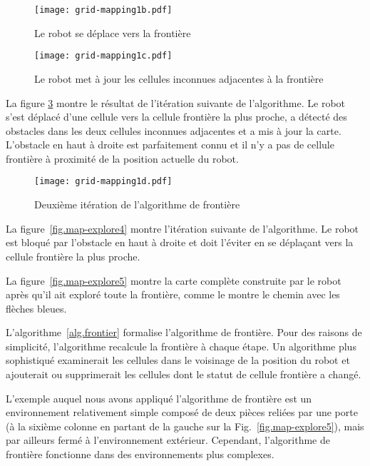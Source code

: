 \begin{figure}
\begin{center}
\texttt{[image: grid-mapping1b.pdf]}
\end{center}
\caption{Le robot se déplace vers la frontière}\label{fig.map-explore1}
\end{figure}

\begin{figure}
\begin{center}
\texttt{[image: grid-mapping1c.pdf]}
\end{center}
\caption{Le robot met à jour les cellules inconnues adjacentes à la frontière}
\label{fig.map-explore2}
\end{figure}

La figure \ref{fig.map-explore3} montre le résultat de l'itération suivante de l'algorithme. Le robot s'est déplacé d'une cellule vers la cellule frontière la plus proche, a détecté des obstacles dans les deux cellules inconnues adjacentes et a mis à jour la carte. L'obstacle en haut à droite est parfaitement connu et il n'y a pas de cellule frontière à proximité de la position actuelle du robot.

\begin{figure}
\begin{center}
\texttt{[image: grid-mapping1d.pdf]}
\end{center}
\caption{Deuxième itération de l'algorithme de frontière}\label{fig.map-explore3}
\end{figure}

La figure~\ref{fig.map-explore4} montre l'itération suivante de l'algorithme. Le robot est bloqué par l'obstacle en haut à droite et doit l'éviter en se déplaçant vers la cellule frontière la plus proche.

La figure~\ref{fig.map-explore5} montre la carte complète construite par le robot après qu'il ait exploré toute la frontière, comme le montre le chemin avec les flèches bleues. 

L'algorithme~\ref{alg.frontier} formalise l'algorithme de frontière. Pour des raisons de simplicité, l'algorithme recalcule la frontière à chaque étape. Un algorithme plus sophistiqué examinerait les cellules dans le voisinage de la position du robot et ajouterait ou supprimerait les cellules dont le statut de cellule frontière a changé.

L'exemple auquel nous avons appliqué l'algorithme de frontière est un environnement relativement simple composé de deux pièces reliées par une porte (à la sixième colonne en partant de la gauche sur la Fig.~\ref{fig.map-explore5}), mais par ailleurs fermé à l'environnement extérieur. Cependant, l'algorithme de frontière fonctionne dans des environnements plus complexes. 

